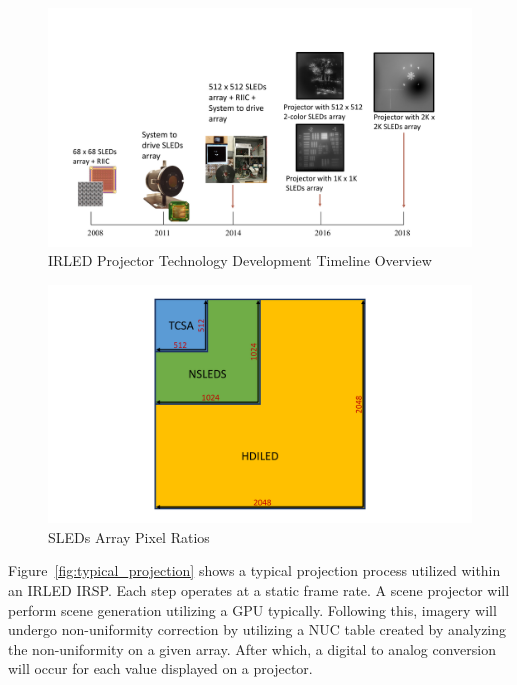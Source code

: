     \begin{figure}
        \centering
        \includegraphics[trim=0.5in 0.5in 0.5in 1.5in,width=1.0\textwidth]{fig/sleds_timeline.pdf}
        \caption{IRLED Projector Technology Development Timeline Overview}
        \label{fig:sleds_timeline}
    \end{figure}

    \begin{figure}
        \centering
        \includegraphics[trim=0.5in 0.5in 0.5in 1.5in,width=1.0\textwidth]{fig/tcsa_nsleds_hdiled_array_ratio.pdf}
        \caption{SLEDs Array Pixel Ratios}
        \label{fig:tcsa_nsleds_hdiled_array_ratio}
    \end{figure}


    Figure~\ref{fig:typical_projection} shows a typical projection process utilized within an IRLED IRSP. Each step operates at a static frame rate. A scene projector will perform scene generation utilizing a GPU typically. Following this, imagery will undergo non-uniformity correction by utilizing a NUC table created by analyzing the non-uniformity on a given array. After which, a digital to analog conversion will occur for each value displayed on a projector.

